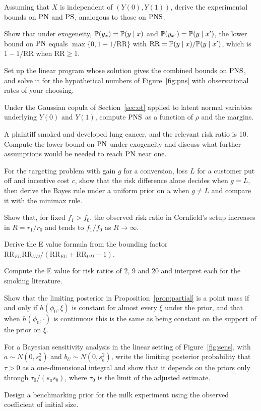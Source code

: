 \begin{exercises}
\item\label{ex:ch11:1} Assuming that $X$ is independent of $(Y(0), Y(1))$, derive the experimental bounds on $\mathrm{PN}$ and $\mathrm{PS}$, analogous to those on $\mathrm{PNS}$.
\item\label{ex:ch11:2} Show that under exogeneity, $\mathbb{P}(y_x) = \mathbb{P}(y \mid x)$ and $\mathbb{P}(y_{x'}) = \mathbb{P}(y \mid x')$, the lower bound on $\mathrm{PN}$ equals $\max\{0, 1 - 1/\mathrm{RR}\}$ with $\mathrm{RR} = \mathbb{P}(y \mid x)/\mathbb{P}(y \mid x')$, which is $1 - 1/\mathrm{RR}$ when $\mathrm{RR} \geq 1$.
\item\label{ex:ch11:3} Set up the linear program whose solution gives the combined bounds on $\mathrm{PNS}$, and solve it for the hypothetical numbers of Figure~\ref{fig:pns} with observational rates of your choosing.
\item\label{ex:ch11:4} Under the Gaussian copula of Section~\ref{sec:ot} applied to latent normal variables underlying $Y(0)$ and $Y(1)$, compute $\mathrm{PNS}$ as a function of $\rho$ and the margins.
\item\label{ex:ch11:5} A plaintiff smoked and developed lung cancer, and the relevant risk ratio is 10. Compute the lower bound on $\mathrm{PN}$ under exogeneity and discuss what further assumptions would be needed to reach $\mathrm{PN}$ near one.
\item\label{ex:ch11:6} For the targeting problem with gain $g$ for a conversion, loss $L$ for a customer put off and incentive cost $c$, show that the risk difference alone decides when $g = L$, then derive the Bayes rule under a uniform prior on $u$ when $g \neq L$ and compare it with the minimax rule.

\item\label{ex:ch12:1} Show that, for fixed $f_1 > f_0$, the observed risk ratio in Cornfield's setup increases in $R = r_1/r_0$ and tends to $f_1/f_0$ as $R \to \infty$.
\item\label{ex:ch12:2} Derive the E value formula from the bounding factor $\mathrm{RR}_{EU}\mathrm{RR}_{UD}/(\mathrm{RR}_{EU} + \mathrm{RR}_{UD} - 1)$.
\item\label{ex:ch12:3} Compute the E value for risk ratios of 2, 9 and 20 and interpret each for the smoking literature.
\item\label{ex:ch12:4} Show that the limiting posterior in Proposition~\ref{prop:partial} is a point mass if and only if $h(\phi_0, \xi)$ is constant for almost every $\xi$ under the prior, and that when $h(\phi_0, \cdot)$ is continuous this is the same as being constant on the support of the prior on $\xi$.
\item\label{ex:ch12:5} For a Bayesian sensitivity analysis in the linear setting of Figure~\ref{fig:sens}, with $a \sim N(0, s_a^2)$ and $b_U \sim N(0, s_b^2)$, write the limiting posterior probability that $\tau > 0$ as a one-dimensional integral and show that it depends on the priors only through $\tau_0/(s_a s_b)$, where $\tau_0$ is the limit of the adjusted estimate.
\item\label{ex:ch12:6} Design a benchmarking prior for the milk experiment using the observed coefficient of initial size.
\end{exercises}
